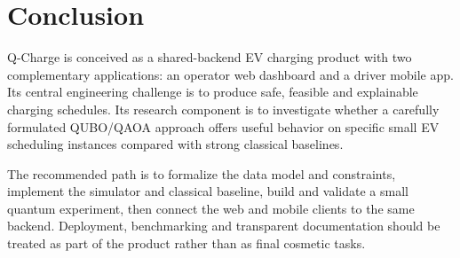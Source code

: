 \documentclass[11pt,a4paper]{article}
\begin{document}
\section{Conclusion}

Q-Charge is conceived as a shared-backend EV charging product with two complementary applications: an operator web dashboard and a driver mobile app. Its central engineering challenge is to produce safe, feasible and explainable charging schedules. Its research component is to investigate whether a carefully formulated QUBO/QAOA approach offers useful behavior on specific small EV scheduling instances compared with strong classical baselines.

The recommended path is to formalize the data model and constraints, implement the simulator and classical baseline, build and validate a small quantum experiment, then connect the web and mobile clients to the same backend. Deployment, benchmarking and transparent documentation should be treated as part of the product rather than as final cosmetic tasks.
\end{document}
